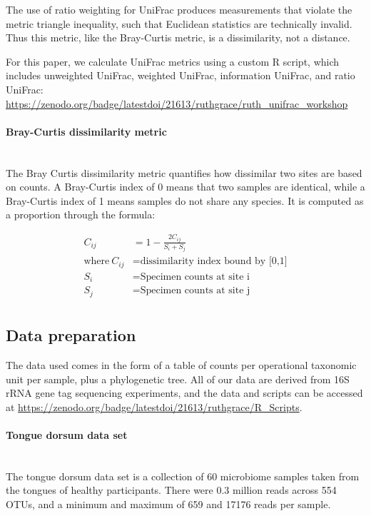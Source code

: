 \documentclass[10pt,letterpaper]{article}
\begin{document}
The use of ratio weighting for UniFrac produces measurements that violate the metric triangle inequality, such that Euclidean statistics are technically invalid. Thus this metric, like the Bray-Curtis metric, is a dissimilarity, not a distance.

For this paper, we calculate UniFrac metrics using a custom R script, which includes unweighted UniFrac, weighted UniFrac, information UniFrac, and ratio UniFrac: \url{https://zenodo.org/badge/latestdoi/21613/ruthgrace/ruth_unifrac_workshop}

\paragraph{Bray-Curtis dissimilarity metric}\mbox{}\\
The Bray Curtis dissimilarity metric \cite{beals1984bray} quantifies how dissimilar two sites are based on counts. A Bray-Curtis index of 0 means that two samples are identical, while a Bray-Curtis index of 1 means samples do not share any species. It is computed as a proportion through the formula:

\begin{align*}
C_{ij} &= 1 - \frac{2C_{ij}}{S_{i} + S_{j}} \\
\text{where}~C_{ij}&= \text{dissimilarity index bound by [0,1]} \\
  S_{i} &= \text{Specimen counts at site i} \\
  S_{j} &= \text{Specimen counts at site j} \\
\end{align*}

\subsection{Data preparation}
The data used comes in the form of a table of counts per operational taxonomic unit per sample, plus a phylogenetic tree. All of our data are derived from 16S rRNA gene tag sequencing experiments, and the data and scripts can be accessed at \url{https://zenodo.org/badge/latestdoi/21613/ruthgrace/R_Scripts}.

\paragraph{Tongue dorsum data set}\mbox{}\\
The tongue dorsum data set is a collection of 60 microbiome samples taken from the tongues of healthy participants. There were 0.3 million reads across 554 OTUs, and a minimum and maximum of 659 and 17176 reads per sample.
\end{document}
